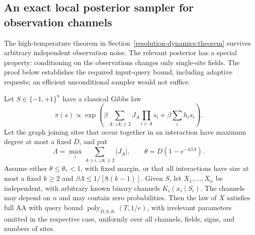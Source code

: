 \subsection{An exact local posterior sampler for observation channels}
\label{sec:resolution-channel-closure}

The high-temperature theorem in
Section~\ref{resolution-dynamics:theorem} survives arbitrary independent
observation noise. The relevant posterior has a special property:
conditioning on the observations changes only single-site fields.
The proof below establishes the required input-query bound, including
adaptive requests; an efficient unconditional sampler would not suffice.

\begin{theorem}
\label{thm:resolution-channel-closure}
Let \(S\in\{-1,+1\}^n\) have a classical Gibbs law
\[
 \pi(s)\propto\exp\left(
       \beta\sum_{A:\,|A|\ge2}J_A\prod_{i\in A}s_i
       +\beta\sum_i h_i s_i\right).
\]
Let the graph joining sites that occur together in an interaction have
maximum degree at most a fixed \(D\), and put
\[
 \Lambda=\max_i\sum_{A\ni i,\,|A|\ge2}|J_A|,
 \qquad \theta=D(1-e^{-4\beta\Lambda}).
\]
Assume either \(\theta\le\theta_*<1\), with fixed margin, or that
all interactions have size at most a fixed \(k\ge2\) and
\(\beta\Lambda\le1/[8(k-1)]\).
Given \(S\), let \(X_1,\ldots,X_n\) be independent, with arbitrary
known binary channels \(K_i(x_i\mid S_i)\). The channels may depend on
\(n\) and may contain zero probabilities. Then the law of \(X\)
satisfies full AA with query bound
\(\operatorname{poly}_{D,k,\theta_*}(T,1/e)\), with irrelevant
parameters omitted in the respective case, uniformly over all
channels, fields, signs, and numbers of sites.
\end{theorem}

